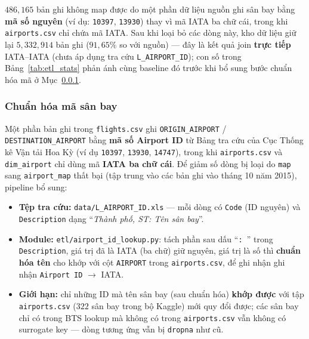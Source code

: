 \noindent
$486{,}165$ bản ghi không map được do một phần dữ liệu nguồn ghi sân bay bằng
\textbf{mã số nguyên} (ví dụ: \texttt{10397}, \texttt{13930}) thay vì mã IATA ba chữ cái,
trong khi \texttt{airports.csv} chỉ chứa mã IATA.
Sau khi loại bỏ các dòng này, kho dữ liệu giữ lại $5{,}332{,}914$ bản ghi
($91{,}65\%$ so với nguồn) --- đây là kết quả join \textbf{trực tiếp} IATA--IATA
(chưa áp dụng tra cứu \texttt{L\_AIRPORT\_ID}); con số trong Bảng~\ref{tab:etl_stats}
phản ánh cùng baseline đó trước khi bổ sung bước chuẩn hóa mã ở Mục~\ref{subsubsec:airport_id_etl}.

\subsubsection{Chuẩn hóa mã sân bay}
\label{subsubsec:airport_id_etl}

Một phần bản ghi trong \texttt{flights.csv} ghi \texttt{ORIGIN\_AIRPORT} / \texttt{DESTINATION\_AIRPORT}
bằng \textbf{mã số Airport ID} từ Bảng tra cứu của Cục Thống kê Vận tải Hoa Kỳ \cite{lookup_tables2015} (ví dụ \texttt{10397}, \texttt{13930}, \texttt{14747}),
trong khi \texttt{airports.csv} và \texttt{dim\_airport} chỉ dùng mã \textbf{IATA ba chữ cái}.
Để giảm số dòng bị loại do \texttt{map} sang \texttt{airport\_map} thất bại (tập trung vào các bản ghi vào tháng 10 năm 2015), pipeline bổ sung:

\begin{itemize}
  \item \textbf{Tệp tra cứu:} \texttt{data/L\_AIRPORT\_ID.xls} --- mỗi dòng có \texttt{Code} (ID nguyên)
        và \texttt{Description} dạng ``\textit{Thành phố, ST: Tên sân bay}''.

  \item \textbf{Module:} \texttt{etl/airport\_id\_lookup.py}:
        tách phần sau dấu ``\texttt{: }'' trong \texttt{Description}, giá trị đã là IATA (ba chữ) giữ nguyên,
        giá trị là số thì \textbf{chuẩn hóa tên} cho khớp với cột \texttt{AIRPORT} trong \texttt{airports.csv},
        để ghi nhận ghi nhận \texttt{Airport ID} $\rightarrow$ IATA.
  \item \textbf{Giới hạn:} chỉ những ID mà tên sân bay (sau chuẩn hóa) \textbf{khớp được}
        với tập \texttt{airports.csv} ($322$ sân bay trong bộ Kaggle) mới quy đổi được;
        các sân bay chỉ có trong BTS lookup mà không có trong \texttt{airports.csv}
        vẫn không có surrogate key --- dòng tương ứng vẫn bị \texttt{dropna} như cũ.
\end{itemize}

